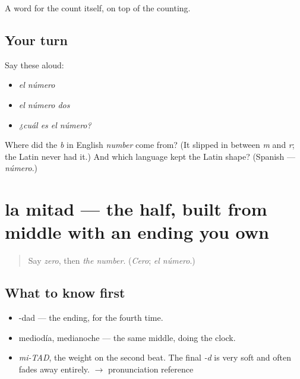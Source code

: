 \begin{grammarlens}[title={What you've built}]
A word for the count itself, on top of the counting.
\end{grammarlens}

\subsection*{Your turn}
Say these aloud:

\begin{itemize}
\raggedright
  \item \emph{el número}
  \item \emph{el número dos}
  \item \emph{¿cuál es el número?}
\end{itemize}

\begin{tcolorbox}[breakable,colback=teal!4,colframe=teal!35!black,title={Before you move on}]
Where did the \emph{b} in English \emph{number} come from? (It slipped in between \emph{m} and \emph{r}; the Latin never had it.) And which language kept the Latin shape? (Spanish — \emph{número}.)
\end{tcolorbox}
\section[la mitad]{la mitad — the half, built from middle with an ending you own}

\label{lesson:ES-C344-mitad}



\begin{quote}
Say \emph{zero}, then \emph{the number}. (\emph{Cero}; \emph{el número}.)
\end{quote}

\subsection*{What to know first}
\begin{itemize}
\raggedright
  \item -dad — the ending, for the fourth time.
  \item mediodía, medianoche — the same middle, doing the clock.
\end{itemize}

\begin{sounds}
\begin{itemize}
\raggedright
  \item \emph{mi-TAD}, the weight on the second beat. The final \emph{-d} is very soft and often fades away entirely. $\to$ pronunciation reference
\end{itemize}
\end{sounds}

